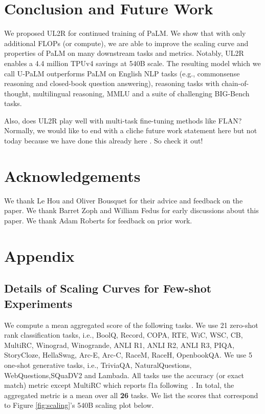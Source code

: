 \documentclass{article}
\newcommand{\methodname}{UL2R\xspace}
\newcommand{\modelname}{U-PaLM\xspace}
\begin{document}
\section{Conclusion and Future Work}
We proposed \methodname for continued training of PaLM. We show that with only  additional FLOPs (or compute), we are able to improve the scaling curve and properties of PaLM on many downstream tasks and metrics. Notably, \methodname{} enables a 4.4 million TPUv4 savings at 540B scale. The resulting model which we call \modelname outperforms PaLM on English NLP tasks (e.g., commonsense reasoning and closed-book question answering), reasoning tasks with chain-of-thought, multilingual reasoning, MMLU and a suite of challenging BIG-Bench tasks. 

Also, does \methodname play well with multi-task fine-tuning methods like FLAN? Normally, we would like to end with a cliche future work statement here but not today because we have done this already here \citep{chung2022flan}. So check it out!


\section*{Acknowledgements}
We thank Le Hou and Oliver Bousquet for their advice and feedback on the paper. We thank Barret Zoph and William Fedus for early discussions about this paper.  We thank Adam Roberts for feedback on prior work.





\newpage
\section{Appendix}

\subsection{Details of Scaling Curves for Few-shot Experiments}
\label{app:fewshot-exp-details}
We compute a mean aggregated score of the following tasks. We use 21 zero-shot rank classification tasks, i.e., BoolQ, Record, COPA, RTE, WiC, WSC, CB, MultiRC, Winograd, Winogrande, ANLI R1, ANLI R2, ANLI R3, PIQA, StoryCloze, HellaSwag, Arc-E, Arc-C, RaceM, RaceH, OpenbookQA. We use 5 one-shot generative tasks, i.e., TriviaQA, NaturalQuestions, WebQuestions,SQuaDV2 and Lambada. All tasks use the accuracy (or exact match) metric except MultiRC which reports f1a following~\citep{brown2020language}. In total, the aggregated metric is a mean over all \textbf{26} tasks. We list the scores that correspond to Figure \ref{fig:scaling}'s 540B scaling plot below.
\end{document}
